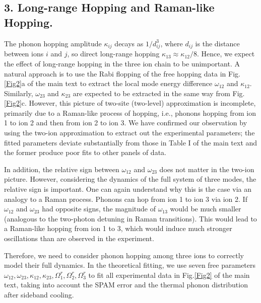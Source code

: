 \documentclass[groupaddress,9pt,twocolumn,superscriptaddress, aps, prl]{revtex4-1}
\begin{document}
\subsection{3. Long-range Hopping and Raman-like Hopping. }
The phonon hopping amplitude $\kappa_{ij}$ decays as $1/d_{ij}^{3}$, where $d_{ij}$ is the distance between ions $i$ and $j$, so direct long-range hopping $\kappa_{13} \approx \kappa_{12}/8$. Hence, we expect the effect of long-range hopping in the three ion chain to be unimportant. A natural approach is to use the Rabi flopping of the free hopping data in Fig.\ref{Fig2}a of the main text to extract the local mode energy difference $\omega_{12}$ and $\kappa_{12}$. Similarly, $\omega_{23}$ and $\kappa_{23}$ are expected to be extracted in the same way from Fig.\ref{Fig2}c. However, this picture of two-site (two-level) approximation is incomplete, primarily due to a Raman-like process of hopping, i.e., phonons hopping from ion 1 to ion 2 and then from ion 2 to ion 3. We have confirmed our observation by using the two-ion approximation to extract out the experimental parameters; the fitted parameters deviate substantially from those in Table I of the main text and the former produce poor fits to other panels of data.

In addition, the relative sign between $\omega_{12}$ and $\omega_{23}$ does not matter in the two-ion picture. However, considering the dynamics of the full system of three modes, the relative sign is important. One can again understand why this is the case via an analogy to a Raman process. Phonons can hop from ion 1 to ion 3 via ion 2. If $\omega_{12}$ and $\omega_{23}$ had opposite signs, the magnitude of $\omega_{13}$ would be much smaller (analogous to the two-photon detuning in Raman transitions). This would lead to a Raman-like hopping from ion 1 to 3, which would induce much stronger oscillations than are observed in the experiment.

Therefore, we need to consider phonon hopping among three ions to correctly model their full dynamics. In the theoretical fitting, we use seven free parameters $\omega_{12}, \omega_{23}, \kappa_{12}, \kappa_{23}, \Omega^{r}_{1}, \Omega^{r}_{2}, \Omega^{r}_{3}$ to fit all experimental data in Fig.\ref{Fig2} of the main text, taking into account the SPAM error and the thermal phonon distribution after sideband cooling.  
\\
\end{document}
